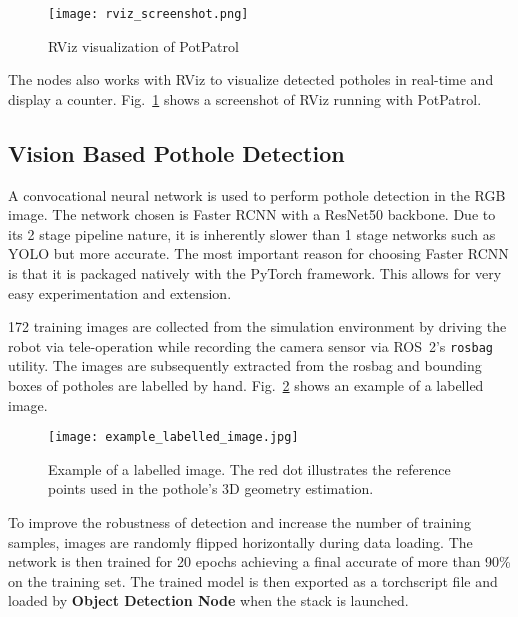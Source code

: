 \documentclass[conference]{IEEEtran}
\begin{document}
\begin{figure}
    \centering
    \texttt{[image: rviz\_screenshot.png]}
    \caption{RViz visualization of PotPatrol}
    \label{fig:rviz_visualisation}
\end{figure}

The nodes also works with RViz to visualize detected potholes in real-time and display a counter. Fig.~\ref{fig:rviz_visualisation} shows a screenshot of RViz running with PotPatrol.

\subsection{Vision Based Pothole Detection}

A convocational neural network is used to perform pothole detection in the RGB image. The network chosen is Faster RCNN\cite{renFasterRCNNRealTime2016} with a ResNet50\cite{heDeepResidualLearning2015} backbone. Due to its 2 stage pipeline nature, it is inherently slower than 1 stage networks such as YOLO\cite{redmonYOLOv3IncrementalImprovement2018} but more accurate. The most important reason for choosing Faster RCNN is that it is packaged natively with the PyTorch framework. This allows for very easy experimentation and extension.

172 training images are collected from the simulation environment by driving the robot via tele-operation while recording the camera sensor via ROS~2's \verb|rosbag| utility. The images are subsequently extracted from the rosbag and bounding boxes of potholes are labelled by hand. Fig.~\ref{fig:example_labelled_image} shows an example of a labelled image.

\begin{figure}[ht]
    \centering
    \texttt{[image: example\_labelled\_image.jpg]}
    \caption{Example of a labelled image. The red dot illustrates the reference points used in the pothole's 3D geometry estimation.}
    \label{fig:example_labelled_image}
\end{figure}

To improve the robustness of detection and increase the number of training samples, images are randomly flipped horizontally during data loading. The network is then trained for 20 epochs achieving a final accurate of more than 90\% on the training set. The trained model is then exported as a torchscript file and loaded by \textbf{Object Detection Node} when the stack is launched.
\end{document}
